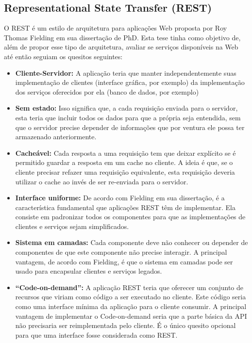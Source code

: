 \documentclass[
	article,			%
	11pt,				%
	oneside,			%
	a4paper,			%
	english,			%
	brazil,				%
	sumario=tradicional
	]{abntex2}
\begin{document}
\subsection{Representational State Transfer (REST)}

O REST é um estilo de arquitetura para aplicações Web proposta por Roy Thomas Fielding em sua dissertação de PhD. \cite{fielding}
Esta tese tinha como objetivo de, além de propor esse tipo de arquitetura, avaliar se serviços disponíveis na Web até então seguiam os quesitos seguintes:

\begin{itemize}
\item \textbf{Cliente-Servidor:} A aplicação teria que manter independentemente suas implementação de clientes (interface gráfica, por exemplo) da implementação dos serviços oferecidos por ela (banco de dados, por exemplo)

\item \textbf{Sem estado:} Isso significa que, a cada requisição enviada para o servidor, esta teria que incluir todos os dados para que a própria seja entendida, sem que o servidor precise depender de informações que por ventura ele possa ter armazenado anteriormente.

\item \textbf{Cacheável:} Cada resposta a uma requisição tem que deixar explícito se é permitido guardar a resposta em um cache no cliente.
A ideia é que, se o cliente precisar refazer uma requisição equivalente, esta requisição deveria utilizar o cache ao invés de ser re-enviada para o servidor.

\item \textbf{Interface uniforme:} De acordo com Fielding em sua dissertação, é a característica fundamental que aplicações REST têm de implementar.
Ela consiste em padronizar todos os componentes para que as implementações de clientes e serviços sejam simplificados.

\item \textbf{Sistema em camadas:} Cada componente deve não conhecer ou depender de componentes de que este componente não precise interagir.
A principal vantagem, de acordo com Fielding, é que o sistema em camadas pode ser usado para encapsular clientes e serviços legados.

\item \textbf{“Code-on-demand”:} A aplicação REST teria que oferecer um conjunto de recursos que viriam como código a ser executado no cliente.
Este código seria como uma interface mínima da aplicação para o cliente consumir.
A principal vantagem de implementar o Code-on-demand seria que a parte básica da API não precisaria ser reimplementada pelo cliente.
É o único quesito opcional para que uma interface fosse considerada como REST.
\end{itemize}
\end{document}

